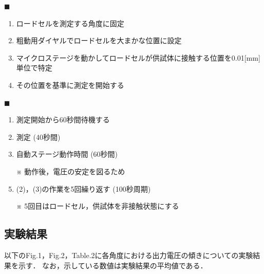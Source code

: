 \documentclass[twocolumn,a4j]{jsarticle}
\begin{document}
$\blacksquare$ 
\begin{enumerate}[(1)]
    \item ロードセルを測定する角度に固定
    \item 粗動用ダイヤルでロードセルを大まかな位置に設定
    \item マイクロステージを動かしてロードセルが供試体に接触する位置を0.01[mm]単位で特定
    \item その位置を基準に測定を開始する
\end{enumerate}

$\blacksquare$ 
\begin{enumerate}[(1)]
    \item 測定開始から60秒間待機する
    \item 測定 (40秒間)
    \item 自動ステージ動作時間 (60秒間)
    \item [※] 動作後，電圧の安定を図るため
    \item (2)，(3)の作業を5回繰り返す (100秒周期)
    \item [※] 5回目はロードセル，供試体を非接触状態にする
\end{enumerate}

\subsection{実験結果}

以下のFig.1，Fig.2，Table.2に各角度における出力電圧の傾きについての実験結果を示す．
なお，示している数値は実験結果の平均値である．
\end{document}
